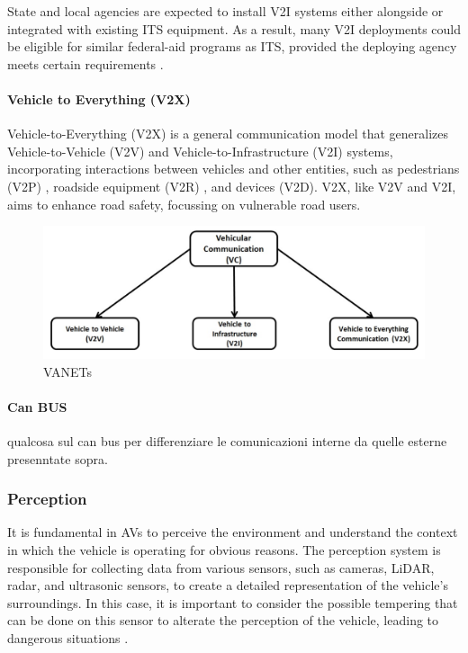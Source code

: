 State and local agencies are expected to install V2I systems either alongside or integrated with existing ITS equipment.
As a result, many V2I deployments could be eligible for similar federal-aid programs as ITS,
provided the deploying agency meets certain requirements \cite{dot2024v2i}.

\paragraph{Vehicle to Everything (V2X)}

Vehicle-to-Everything (V2X) is a general communication model that generalizes Vehicle-to-Vehicle (V2V) and Vehicle-to-Infrastructure (V2I) systems,
incorporating interactions between vehicles and other entities, such as pedestrians (V2P) \cite{vehicle-to-pedestrian}, roadside equipment (V2R) \cite{vehicle-to-roadside}, and devices (V2D).
V2X, like V2V and V2I, aims to enhance road safety, focussing on vulnerable road users.

\begin{figure}[!htb]
    \centering
    \includegraphics[width=0.7\linewidth]{figures/communication}
    \caption{VANETs}
    \label{fig:communication}
\end{figure}

\paragraph{Can BUS}
qualcosa  sul can bus per differenziare le comunicazioni interne  da quelle esterne presenntate sopra.

\subsubsection{Perception}\label{subsubsec:perception}
It is fundamental in AVs to perceive the environment and understand the context in which the vehicle is operating for obvious reasons.
The perception system is responsible for collecting data from various sensors, such as cameras, LiDAR, radar, and ultrasonic sensors, to create a detailed representation of the vehicle's surroundings.
In this case, it is important to consider the possible tempering that can be done on this sensor to alterate the perception of the vehicle, leading to dangerous situations \cite{kim2020cybersecurity, sec-sensors-2023, metro2020analysis, attacks-2020} .

